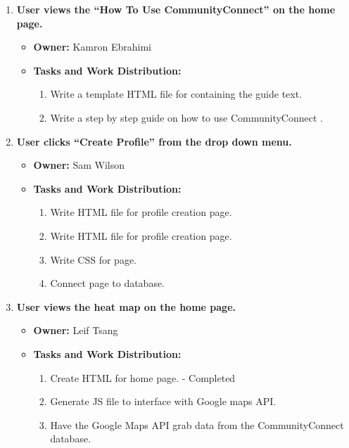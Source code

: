 \documentclass[12pt]{article}
\begin{document}
  \begin{enumerate}

    \item \textbf{User views the “How To Use CommunityConnect” on the home page.}
      \begin{itemize}
        \item \textbf{Owner:} Kamron Ebrahimi
        \item \textbf{Tasks and Work Distribution:}
          \begin{enumerate}
            \item Write a template HTML file for containing the guide text.
            \item  Write a step by step guide on how to use CommunityConnect .
          \end{enumerate}
      \end{itemize}

    \item \textbf{User clicks “Create Profile” from the drop down menu.}
      \begin{itemize}
        \item \textbf{Owner:} Sam Wilson
        \item \textbf{Tasks and Work Distribution:}
          \begin{enumerate}
            \item Write HTML file for profile creation page.
            \item Write HTML file for profile creation page.
            \item Write CSS for page.
            \item Connect page to database.
          \end{enumerate}
      \end{itemize}

    \item \textbf{User views the heat map on the home page.}
      \begin{itemize}
        \item \textbf{Owner:} Leif Tsang
        \item \textbf{Tasks and Work Distribution:}
          \begin{enumerate}
            \item Create HTML for home page. - Completed
            \item Generate JS file to interface with Google maps API.
            \item Have the Google Maps API grab data from the CommunityConnect database.
          \end{enumerate}
      \end{itemize}


\end{enumerate}
\end{document}
